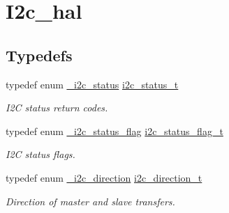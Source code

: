 \hypertarget{group__i2c__hal}{}\section{I2c\+\_\+hal}
\label{group__i2c__hal}
\subsection*{Typedefs}
\begin{DoxyCompactItemize}
\item 
typedef enum \hyperlink{group__i2c__hal_ga7cc91c89125c25a88e463a9e8550b284}{\+\_\+i2c\+\_\+status} \hyperlink{group__i2c__hal_gadcd21817de0b2ccfe00295f61eb078bf}{i2c\+\_\+status\+\_\+t}\hypertarget{group__i2c__hal_gadcd21817de0b2ccfe00295f61eb078bf}{}\label{group__i2c__hal_gadcd21817de0b2ccfe00295f61eb078bf}

\begin{DoxyCompactList}\small\item\em I2C status return codes. \end{DoxyCompactList}\item 
typedef enum \hyperlink{group__i2c__hal_ga94540c1edc80ad8d2b3173114d04259d}{\+\_\+i2c\+\_\+status\+\_\+flag} \hyperlink{group__i2c__hal_gae0adf3ae66a4b77e79fa9ee483380d33}{i2c\+\_\+status\+\_\+flag\+\_\+t}\hypertarget{group__i2c__hal_gae0adf3ae66a4b77e79fa9ee483380d33}{}\label{group__i2c__hal_gae0adf3ae66a4b77e79fa9ee483380d33}

\begin{DoxyCompactList}\small\item\em I2C status flags. \end{DoxyCompactList}\item 
typedef enum \hyperlink{group__i2c__hal_ga1625497320644ba123718bafdd2c1f39}{\+\_\+i2c\+\_\+direction} \hyperlink{group__i2c__hal_ga4bf954d998f086594eece268c780bec7}{i2c\+\_\+direction\+\_\+t}\hypertarget{group__i2c__hal_ga4bf954d998f086594eece268c780bec7}{}\label{group__i2c__hal_ga4bf954d998f086594eece268c780bec7}

\begin{DoxyCompactList}\small\item\em Direction of master and slave transfers. \end{DoxyCompactList}\end{DoxyCompactItemize}
